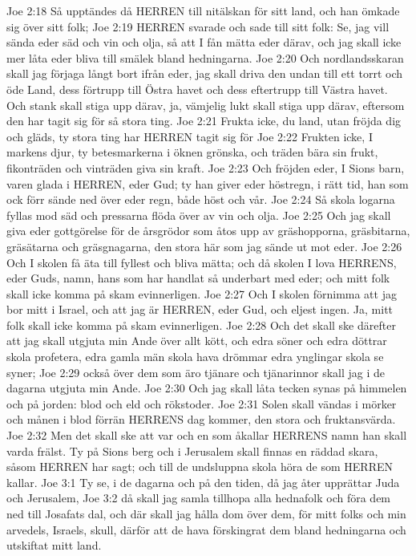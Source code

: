 Joe 2:18  Så upptändes då HERREN till nitälskan för sitt land, och han ömkade sig över sitt folk;
Joe 2:19  HERREN svarade och sade till sitt folk: Se, jag vill sända eder säd och vin och olja, så att I fån mätta eder därav, och jag skall icke mer låta eder bliva till smälek bland hedningarna.
Joe 2:20  Och nordlandsskaran skall jag förjaga långt bort ifrån eder, jag skall driva den undan till ett torrt och öde Land, dess förtrupp till Östra havet och dess eftertrupp till Västra havet. Och stank skall stiga upp därav, ja, vämjelig lukt skall stiga upp därav, eftersom den har tagit sig för så stora ting.
Joe 2:21  Frukta icke, du land, utan fröjda dig och gläds, ty stora ting har HERREN tagit sig för
Joe 2:22  Frukten icke, I markens djur, ty betesmarkerna i öknen grönska, och träden bära sin frukt, fikonträden och vinträden giva sin kraft.
Joe 2:23  Och fröjden eder, I Sions barn, varen glada i HERREN, eder Gud; ty han giver eder höstregn, i rätt tid, han som ock förr sände ned över eder regn, både höst och vår.
Joe 2:24  Så skola logarna fyllas mod säd och pressarna flöda över av vin och olja.
Joe 2:25  Och jag skall giva eder gottgörelse för de årsgrödor som åtos upp av gräshopporna, gräsbitarna, gräsätarna och gräsgnagarna, den stora här som jag sände ut mot eder.
Joe 2:26  Och I skolen få äta till fyllest och bliva mätta; och då skolen I lova HERRENS, eder Guds, namn, hans som har handlat så underbart med eder; och mitt folk skall icke komma på skam evinnerligen.
Joe 2:27  Och I skolen förnimma att jag bor mitt i Israel, och att jag är HERREN, eder Gud, och eljest ingen. Ja, mitt folk skall icke komma på skam evinnerligen.
Joe 2:28  Och det skall ske därefter att jag skall utgjuta min Ande över allt kött, och edra söner och edra döttrar skola profetera, edra gamla män skola hava drömmar edra ynglingar skola se syner;
Joe 2:29  också över dem som äro tjänare och tjänarinnor skall jag i de dagarna utgjuta min Ande.
Joe 2:30  Och jag skall låta tecken synas på himmelen och på jorden: blod och eld och rökstoder.
Joe 2:31  Solen skall vändas i mörker och månen i blod förrän HERRENS dag kommer, den stora och fruktansvärda.
Joe 2:32  Men det skall ske att var och en som åkallar HERRENS namn han skall varda frälst. Ty på Sions berg och i Jerusalem skall finnas en räddad skara, såsom HERREN har sagt; och till de undsluppna skola höra de som HERREN kallar.
Joe 3:1  Ty se, i de dagarna och på den tiden, då jag åter upprättar Juda och Jerusalem,
Joe 3:2  då skall jag samla tillhopa alla hednafolk och föra dem ned till Josafats dal, och där skall jag hålla dom över dem, för mitt folks och min arvedels, Israels, skull, därför att de hava förskingrat dem bland hedningarna och utskiftat mitt land.

